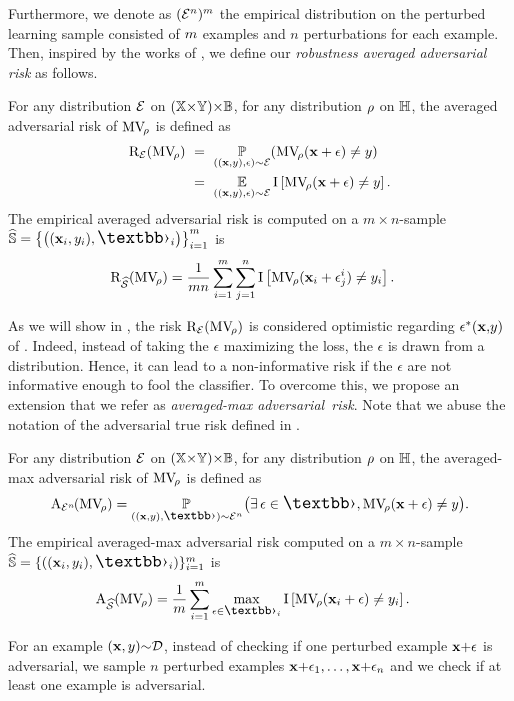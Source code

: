Furthermore, we denote as $({\mathcal{E}}^n)^m$ the empirical distribution on the perturbed learning sample consisted of $m$ examples and $n$ perturbations for each example.
Then, inspired by the works of \citet{ZantedeschiNicolaeRawat2017,HendrycksDietterich2019}, we define our {\it robustness averaged adversarial risk} as follows.
\begin{definition}
\label{chap:mv-robustness:def:average_rob_risk}
For any distribution ${\mathcal{E}}$ on $(\mathbb{X}{\times}\mathbb{Y}){\times}\mathbb{B}$, for any distribution $\rho$ on $\mathbb{H}$, the averaged adversarial risk of $\text{MV}_{\!\rho}$ is defined as
\begin{align*}
\text{R}_{{\mathcal{E}}}(\text{MV}_{\!\rho}) \ &=\  \operatorname*{\mathbb{P}}_{((\mathbf{x},y), \epsilon)\sim {\ensuremath{\mathcal{E}}}}(\text{MV}_{\!\rho}(\mathbf{x}+\epsilon) \neq y)\ \\
&=\ \operatorname*{\mathbb{E}}_{((\mathbf{x},y), \epsilon)\sim {\ensuremath{\mathcal{E}}}}\operatorname{I}\left[\text{MV}_{\!\rho}(\mathbf{x}+\epsilon) \neq y\right].
\end{align*}
The empirical averaged adversarial risk is computed on a $m{\times}n$-sample $\Spert=\LC \LP (\x_i,\y_i), \Epert_i\RP\RC_{i=1}^{\m}$ is 
\begin{align}
 \nonumber\text{R}_{\widehat{\mathcal{S}}}(\text{MV}_{\!\rho}) &= 
    \frac{1}{mn} \sum_{i=1}^m\sum_{j=1}^n \operatorname{I}\left[\text{MV}_{\!\rho}(\mathbf{x}_i+\epsilon^i_j) \neq y_i\right].
\end{align}
\end{definition}
As we will show in ,  the risk $\text{R}_{{\mathcal{E}}}(\text{MV}_{\!\rho})$ is considered optimistic regarding $\epsilon^*(\mathbf{x}{,}y)$ of .
Indeed, instead of taking the $\epsilon$ maximizing the loss, the $\epsilon$ is drawn from a distribution.
Hence, it can lead to a non-informative risk if the $\epsilon$ are not informative enough to fool the classifier.
To overcome this, we propose an extension that we refer as 
{\it averaged-max \mbox{adversarial risk}}. 
Note that we abuse the notation of the adversarial true risk defined in .

\begin{definition}
\label{chap:mv-robustness:def:average_max_risk}
 For any distribution ${\mathcal{E}}$ on $(\mathbb{X}{\times}\mathbb{Y}){\times}\mathbb{B}$, for any distribution $\rho$ on $\mathbb{H}$, the averaged-max adversarial risk of $\text{MV}_{\!\rho}$ is defined as
\begin{align*}
\RiskM_{\Dpert^{n\!}}(\MVQ) = \PP_{((\x,\y), \Epert)\sim\Dpert^{n\!}} \big( \exists\, \epsilon\in\Epert, \MVQ(\x+\epsilon) \ne \y \big). 
\end{align*}
The empirical averaged-max adversarial risk  computed on a $m\!\times\!n$-sample $\Spert=\{( (\x_i,\y_i), \Epert_i )\}_{i=1}^{\m}$ is
\begin{align*}
\RiskM_{\dSpert}(\MVQ) &= \frac{1}{\m} \sum_{i=1}^\m \max_{\epsilon\in\Epert_i}\indic\LB\MVQ(\x_i+\epsilon) \neq \y_i\RB.
\end{align*}
\end{definition}
For an example $(\mathbf{x},y){\sim}\mathcal{D}$, instead of checking if one perturbed example $\mathbf{x}{+}\epsilon$ is  adversarial, we sample $n$ perturbed examples $\mathbf{x}{+}\epsilon_1,\ldots, \mathbf{x}{+}\epsilon_n$ and we check if at least one example is adversarial.

